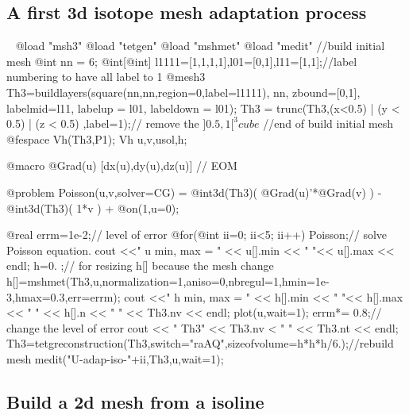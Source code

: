 \documentclass[a4paper,twoside,12pt]{book}
\begin{document}
\subsection{A first 3d isotope mesh adaptation process}
\begin{example}
\label{ex:tetg-adap}~\hfill\break
\bFF
@load "msh3" @load "tetgen" @load "mshmet" @load "medit"
//build initial mesh
@int nn  = 6;
@int[@int] l1111=[1,1,1,1],l01=[0,1],l11=[1,1];//label numbering to have all label to 1 
@mesh3 Th3=buildlayers(square(nn,nn,region=0,label=l1111),
      nn,  zbound=[0,1],  labelmid=l11,   labelup = l01,  labeldown = l01);
Th3 = trunc(Th3,(x<0.5) | (y < 0.5) | (z < 0.5) ,label=1);// remove the $]0.5,1[^3 cube$
//end of build initial mesh
@fespace Vh(Th3,P1);
Vh u,v,usol,h;

@macro @Grad(u) [dx(u),dy(u),dz(u)] // EOM

@problem Poisson(u,v,solver=CG) = @int3d(Th3)( @Grad(u)'*@Grad(v) )  
                                 -@int3d(Th3)( 1*v ) + @on(1,u=0);

@real errm=1e-2;// level of error 
@for(@int ii=0; ii<5; ii++)
{
  Poisson;// solve Poisson equation. 
  cout <<" u min, max = " <<  u[].min << " "<< u[].max << endl;
  h=0. ;// for resizing h[] because the mesh change 
  h[]=mshmet(Th3,u,normalization=1,aniso=0,nbregul=1,hmin=1e-3,hmax=0.3,err=errm);
  cout <<" h min, max = " <<  h[].min << " "<< h[].max 
       << " " << h[].n << " " << Th3.nv << endl;
  plot(u,wait=1);
  errm*= 0.8;// change the level of error
  cout << " Th3" << Th3.nv < " " << Th3.nt << endl;
  Th3=tetgreconstruction(Th3,switch="raAQ",sizeofvolume=h*h*h/6.);//rebuild mesh
  medit("U-adap-iso-"+ii,Th3,u,wait=1);}
\eFF
\end{example}

\subsection{Build a 2d mesh from a isoline}
\end{document}

